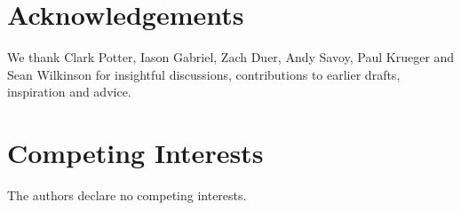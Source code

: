 \documentclass[12pt]{article}
\begin{document}





\section*{Acknowledgements} 

We thank Clark Potter, Iason Gabriel, Zach Duer, Andy Savoy, Paul Krueger and Sean Wilkinson for insightful discussions, contributions to earlier drafts, inspiration and advice.

\section*{Competing Interests}

The authors declare no competing interests.


\end{document}
